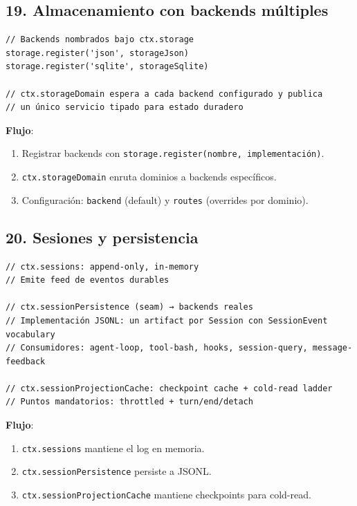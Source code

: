 \documentclass[11pt,a4paper]{article}
\begin{document}
\subsection*{19. Almacenamiento con backends múltiples}


\begin{lstlisting}
// Backends nombrados bajo ctx.storage
storage.register('json', storageJson)
storage.register('sqlite', storageSqlite)

// ctx.storageDomain espera a cada backend configurado y publica
// un único servicio tipado para estado duradero
\end{lstlisting}


\textbf{Flujo}:


\begin{enumerate}[leftmargin=*,topsep=2pt,itemsep=1pt]
  \item Registrar backends con \texttt{storage.register(nombre, implementación)}.
  \item \texttt{ctx.storageDomain} enruta dominios a backends específicos.
  \item Configuración: \texttt{backend} (default) y \texttt{routes} (overrides por dominio).
\end{enumerate}


\subsection*{20. Sesiones y persistencia}


\begin{lstlisting}
// ctx.sessions: append-only, in-memory
// Emite feed de eventos durables

// ctx.sessionPersistence (seam) → backends reales
// Implementación JSONL: un artifact por Session con SessionEvent vocabulary
// Consumidores: agent-loop, tool-bash, hooks, session-query, message-feedback

// ctx.sessionProjectionCache: checkpoint cache + cold-read ladder
// Puntos mandatorios: throttled + turn/end/detach
\end{lstlisting}


\textbf{Flujo}:


\begin{enumerate}[leftmargin=*,topsep=2pt,itemsep=1pt]
  \item \texttt{ctx.sessions} mantiene el log en memoria.
  \item \texttt{ctx.sessionPersistence} persiste a JSONL.
  \item \texttt{ctx.sessionProjectionCache} mantiene checkpoints para cold-read.
\end{enumerate}
\end{document}
